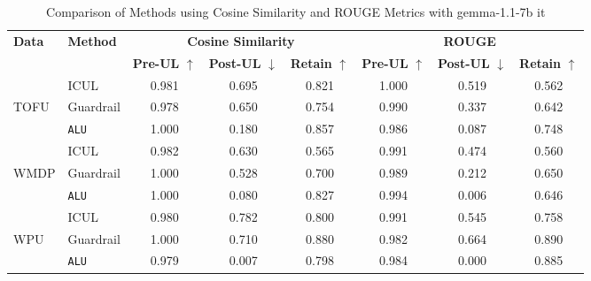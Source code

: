 \begin{table*}[]
    \centering
    \caption{Comparison of Methods using Cosine Similarity and ROUGE Metrics with gemma-1.1-7b it}
    \begin{tabular}{llccc|ccc}
        \toprule
        \textbf{Data}&\textbf{Method} & \multicolumn{3}{c}{\textbf{Cosine Similarity}} & \multicolumn{3}{c}{\textbf{ROUGE}} \\
        \cmidrule(lr){3-5} \cmidrule(lr){6-8}
         & & \textbf{Pre-UL} $\uparrow$ & \textbf{Post-UL} $\downarrow$ & \textbf{Retain} $\uparrow$ & \textbf{Pre-UL} $\uparrow$ & \textbf{Post-UL} $\downarrow$ & \textbf{Retain} $\uparrow$ \\
        \midrule
        &ICUL & 0.981 & 0.695 & 0.821 & 1.000 & 0.519 & 0.562 \\
        TOFU &Guardrail & 0.978 & 0.650 & 0.754 & 0.990 & 0.337 & 0.642 \\
        &\texttt{ALU}  & 1.000 & 0.180 & 0.857 & 0.986 & 0.087 & 0.748 \\
        \midrule
        &ICUL  & 0.982 & 0.630 & 0.565 & 0.991 & 0.474 & 0.560 \\
        WMDP & Guardrail  & 1.000  & 0.528 & 0.700 & 0.989 & 0.212 & 0.650 \\
        &\texttt{ALU} & 1.000  & 0.080 & 0.827 & 0.994 & 0.006 & 0.646 \\
        \midrule
        &ICUL  & 0.980 & 0.782 & 0.800 & 0.991 & 0.545 & 0.758 \\
        WPU &Guardrail & 1.000 & 0.710 & 0.880 & 0.982 & 0.664 & 0.890 \\
        &\texttt{ALU} & 0.979 & 0.007 & 0.798 & 0.984 & 0.000 & 0.885 \\
        
        \bottomrule
    \end{tabular}
\label{tab:t20}    
\end{table*}

